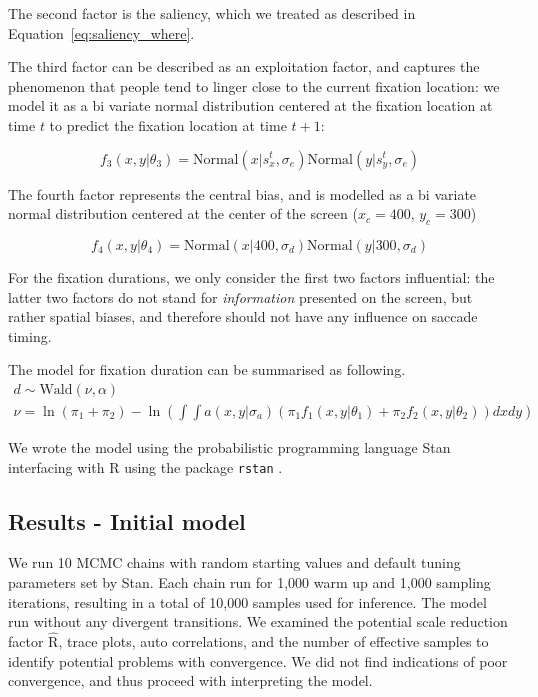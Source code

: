 \documentclass{article}
\begin{document}
The second factor is the saliency, which we treated as described in Equation~\ref{eq:saliency_where}.

The third factor can be described as an exploitation factor, and captures the phenomenon that people tend to linger close to the current fixation location: we model it as a bi variate normal distribution centered at the fixation location at time $t$ to predict the fixation location at time $t+1$:

\begin{equation}
    f_3(x, y|\theta_3) = \text{Normal}(x | s_x^t, \sigma_e) \text{Normal}(y | s_y^t, \sigma_e)
\end{equation}

The fourth factor represents the central bias, and is modelled as a bi variate normal distribution centered at the center of the screen ($x_c = 400$, $y_c = 300$)

\begin{equation}
    f_4(x, y|\theta_4) = \text{Normal}(x | 400, \sigma_d) \text{Normal}(y | 300, \sigma_d)
\end{equation}

For the fixation durations, we only consider the first two factors influential: the latter two factors do not stand for \textit{information} presented on the screen, but rather spatial biases, and therefore should not have any influence on saccade timing.

The model for fixation duration can be summarised as following.
\begin{gather*}
    d \sim \text{Wald}(\nu, \alpha) \\
    \nu = \ln(\pi_1 + \pi_2) - \ln\left(\int\int a(x, y | \sigma_a) \left(\pi_1 f_1(x, y | \theta_1) + \pi_2 f_2(x, y | \theta_2)\right)dxdy\right)
\end{gather*}


We wrote the model using the probabilistic programming language Stan \citep{carpenter2017stan} interfacing with R \citep{citeR} using the package \texttt{rstan} \citep{team2020rstan}.

\subsection{Results - Initial model}

We run 10 MCMC chains with random starting values and default tuning parameters set by Stan. Each chain run for 1,000 warm up and 1,000 sampling iterations, resulting in a total of 10,000 samples used for inference.
The model run without any divergent transitions. We examined the potential scale reduction factor $\hat{\text{R}}$, trace plots, auto correlations, and the number of effective samples to identify potential problems with convergence. We did not find indications of poor convergence, and thus proceed with interpreting the model.
\end{document}
